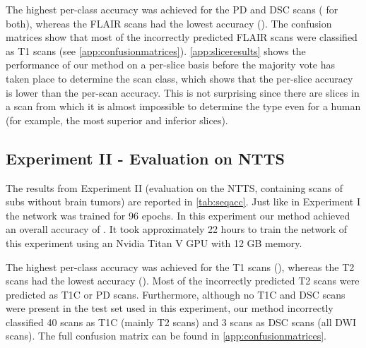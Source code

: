 The highest per-class accuracy was achieved for the \gls{PD} and \gls{DSC} \glspl{scan} ( for both), whereas the \gls{FLAIR} \glspl{scan} had the lowest accuracy ().
The confusion matrices show that most of the incorrectly predicted \gls{FLAIR} \glspl{scan} were classified as \gls{T1} \glspl{scan} (see  \cref{app:confusionmatrices}).
\cref{app:sliceresults} shows the performance of our method on a per-\gls{slice} basis before the majority vote has taken place to determine the \gls{scan} \gls{class}, which shows that the per-\gls{slice} accuracy is lower than the per-\gls{scan} accuracy.
This is not surprising since there are \glspl{slice} in a \gls{scan} from which it is almost impossible to determine the \gls{type} even for a human (for example, the most superior and inferior \glspl{slice}).


\subsection{Experiment II - Evaluation on \gls{NTTS}}
The results from Experiment II (evaluation on the \gls{NTTS}, containing \glspl{scan} of \glspl{sub} without brain tumors) are reported in \cref{tab:seqacc}.
Just like in Experiment I the network was trained for 96 epochs.
In this experiment our method achieved an overall accuracy of .
It took approximately 22 hours to train the network of this experiment using an Nvidia Titan V GPU with 12 GB memory.

The highest per-class accuracy was achieved for the \gls{T1} \glspl{scan} (), whereas the \gls{T2} \glspl{scan} had the lowest accuracy ().
Most of the incorrectly predicted \gls{T2} \glspl{scan} were predicted as \gls{T1C} or \gls{PD} \glspl{scan}.
Furthermore, although no \gls{T1C} and \gls{DSC} \glspl{scan} were present in the test set used in this experiment, our method incorrectly classified 40 \glspl{scan} as \gls{T1C} (mainly \gls{T2} \glspl{scan}) and 3 \glspl{scan} as \gls{DSC} \glspl{scan} (all \gls{DWI} \glspl{scan}).
The full confusion matrix can be found in \cref{app:confusionmatrices}.

